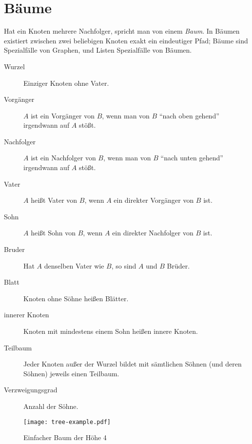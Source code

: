 \section{Bäume}
Hat ein Knoten mehrere Nachfolger, spricht man von einem \emph{Baum}.
In Bäumen existiert zwischen zwei beliebigen Knoten exakt ein eindeutiger Pfad; Bäume sind Spezialfälle von Graphen, und Listen Spezialfälle von Bäumen.
\begin{description}
  \item[Wurzel] Einziger Knoten ohne Vater.
  \item[Vorgänger] $A$ ist ein Vorgänger von $B$, wenn man von $B$ \enquote{nach oben gehend} irgendwann auf $A$ stößt.
  \item[Nachfolger] $A$ ist ein Nachfolger von $B$, wenn man von $B$ \enquote{nach unten gehend} irgendwann auf $A$ stößt.
  \item[Vater] $A$ heißt Vater von $B$, wenn $A$ ein direkter Vorgänger von $B$ ist.
  \item[Sohn] $A$ heißt Sohn von $B$, wenn $A$ ein direkter Nachfolger von $B$ ist.
  \item[Bruder] Hat $A$ denselben Vater wie $B$, so sind $A$ und $B$ Brüder.
  \item[Blatt] Knoten ohne Söhne heißen Blätter.
  \item[innerer Knoten] Knoten mit mindestens einem Sohn heißen innere Knoten.
  \item[Teilbaum] Jeder Knoten außer der Wurzel bildet mit sämtlichen Söhnen (und deren Söhnen) jeweils einen Teilbaum.
  \item[Verzweigungsgrad] Anzahl der Söhne.
\end{description}

\bigskip
\begin{figure}[htb]
\centering
\texttt{[image: tree-example.pdf]}

\caption{Einfacher Baum der Höhe 4}
\end{figure}

